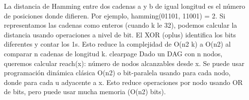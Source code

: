 \markdownRendererDocumentBegin
\markdownRendererSectionBegin
\markdownRendererSectionBegin
{}\markdownRendererInterblockSeparator
{}\markdownRendererSectionBegin
{}\markdownRendererParagraphSeparator
{}La distancia de Hamming entre dos cadenas \markdownRendererDollarSign{}a\markdownRendererDollarSign{} y \markdownRendererDollarSign{}b\markdownRendererDollarSign{} de igual longitud es el número de posiciones donde difieren. Por ejemplo, \markdownRendererDollarSign{}hamming(01101, 11001) = 2\markdownRendererDollarSign{}.\markdownRendererParagraphSeparator
{}Si representamos las cadenas como enteros (cuando \markdownRendererDollarSign{}k \markdownRendererBackslash{}le 32\markdownRendererDollarSign{}), podemos calcular la distancia usando operaciones a nivel de bit. El XOR (\markdownRendererDollarSign{}\markdownRendererBackslash{}oplus\markdownRendererDollarSign{}) identifica los bits diferentes y contar los 1s.\markdownRendererParagraphSeparator
{}Esto reduce la complejidad de O(\markdownRendererDollarSign{}n\markdownRendererCircumflex{}2 k\markdownRendererDollarSign{}) a O(\markdownRendererDollarSign{}n\markdownRendererCircumflex{}2\markdownRendererDollarSign{}) al comparar \markdownRendererDollarSign{}n\markdownRendererDollarSign{} cadenas de longitud \markdownRendererDollarSign{}k\markdownRendererDollarSign{}.\markdownRendererInterblockSeparator
{}\markdownRendererInterblockSeparator
{}\markdownRendererDollarSign{}\markdownRendererBackslash{}clearpage\markdownRendererDollarSign{}\markdownRendererInterblockSeparator
{}
\markdownRendererSectionEnd \markdownRendererSectionBegin
{}\markdownRendererInterblockSeparator
{}Dado un DAG con \markdownRendererDollarSign{}n\markdownRendererDollarSign{} nodos, queremos calcular \markdownRendererDollarSign{}reach(x)\markdownRendererDollarSign{}: número de nodos alcanzables desde \markdownRendererDollarSign{}x\markdownRendererDollarSign{}.\markdownRendererParagraphSeparator
{}Se puede usar programación dinámica clásica O(\markdownRendererDollarSign{}n\markdownRendererCircumflex{}2\markdownRendererDollarSign{}) o bit-paralela usando  para cada nodo, donde  para cada \markdownRendererDollarSign{}u\markdownRendererDollarSign{} adyacente a \markdownRendererDollarSign{}x\markdownRendererDollarSign{}. Esto reduce operaciones por nodo usando OR de bits, pero puede usar mucha memoria (\markdownRendererDollarSign{}O(n\markdownRendererCircumflex{}2)\markdownRendererDollarSign{} bits).\markdownRendererInterblockSeparator
